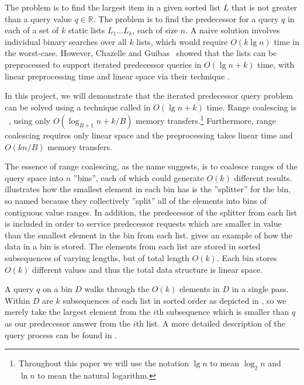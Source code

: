 
The  problem is to find the largest item in a given sorted list $L$
that is not greater than a query value $q \in \mathbb{R}$.  The  
problem is to find the predecessor for a query $q$ in each of a set of $k$ static lists
$L_1 \ldots L_k$, each of size $n$.  A naive solution involves individual binary searches over all
$k$ lists, which would require $O(k \lg n)$ time in the worst-case.  However, Chazelle
and Guibas~\cite{ChazelleGu86a} showed that the lists can be 
preprocessed to support iterated predecessor queries in $O(\lg n + k)$ time, with
linear preprocessing time and linear space via their technique .

In this project, we will demonstrate that the iterated predecessor query problem
can be solved using a technique called  in $O(\lg n + k)$ time.
Range coalescing is ~\cite{FrigoLePr99}, using only 
$O(\log_{B+1} n + k/B)$ memory transfers.\footnote{Throughout this paper we will 
use the notation $\lg n$ to mean $\log_2 n$ and $\ln n$ to mean the natural logarithm.}  
Furthermore, range coalescing requires
only linear space and the preprocessing takes linear time and $O(kn/B)$ memory
transfers.

The essence of range coalescing, as the name suggests, is to coalesce ranges of 
the query space into $n$ ''bins'', each of which could generate $O(k)$ different results.
 illustrates how the smallest element in each bin has 
is the ''splitter'' for the bin, so named because they collectively ''split'' all
of the elements into bins of contiguous value ranges.  In addition,
the predecessor of the splitter from each list is included in order to
service predecessor requests which are smaller in value than the smallest element
in the bin from each list.   gives an example of how the data
in a bin is stored.  The elements from each list are stored in sorted subsequences of
varying lengths, but of total length $O(k)$. Each bin stores $O(k)$ different 
values and thus the total data structure is linear space.

A query $q$ on a bin $D$ walks through the $O(k)$ elements in $D$ in a single pass.
Within $D$ are $k$ subsequences of each list in sorted order as depicted in 
, so we merely take the
largest element from the $i$th subsequence which is smaller than $q$ as our predecessor
answer from the $i$th list.  A more detailed description of the query process can
be found in .

